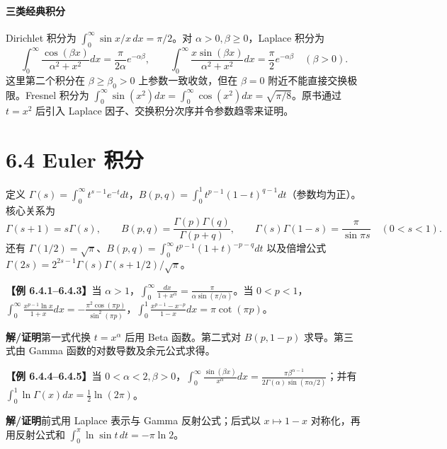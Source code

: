 \documentclass[UTF8,a4paper,11pt]{ctexart}
\newcommand{\ex}[1]{\par\noindent\textbf{【例 #1】}\;}
\newcommand{\sol}{\par\noindent\textbf{解/证明}\;}
\begin{document}
\paragraph{三类经典积分}Dirichlet 积分为 $\int_0^\infty\sin x/x\,dx=\pi/2$。对 $\alpha>0,\beta\ge0$，Laplace 积分为
\[\int_0^\infty\frac{\cos(\beta x)}{\alpha^2+x^2}dx=\frac\pi{2\alpha}e^{-\alpha\beta},\qquad
\int_0^\infty\frac{x\sin(\beta x)}{\alpha^2+x^2}dx=\frac\pi2e^{-\alpha\beta}\quad(\beta>0).\]
这里第二个积分在 $\beta\ge\beta_0>0$ 上参数一致收敛，但在 $\beta=0$ 附近不能直接交换极限。Fresnel 积分为 $\int_0^\infty\sin(x^2)dx=\int_0^\infty\cos(x^2)dx=\sqrt{\pi/8}$。原书通过 $t=x^2$ 后引入 Laplace 因子、交换积分次序并令参数趋零来证明。
\section*{6.4 Euler 积分}
定义 $\Gamma(s)=\int_0^\infty t^{s-1}e^{-t}dt$，$B(p,q)=\int_0^1t^{p-1}(1-t)^{q-1}dt$（参数均为正）。核心关系为
\[\Gamma(s+1)=s\Gamma(s),\qquad B(p,q)=\frac{\Gamma(p)\Gamma(q)}{\Gamma(p+q)},\qquad \Gamma(s)\Gamma(1-s)=\frac\pi{\sin\pi s}\quad(0<s<1).\]
还有 $\Gamma(1/2)=\sqrt\pi$、$B(p,q)=\int_0^\infty t^{p-1}(1+t)^{-p-q}dt$ 以及倍增公式 $\Gamma(2s)=2^{2s-1}\Gamma(s)\Gamma(s+1/2)/\sqrt\pi$。
\ex{6.4.1--6.4.3}当 $\alpha>1$，$\displaystyle\int_0^\infty\frac{dx}{1+x^\alpha}=\frac\pi{\alpha\sin(\pi/\alpha)}$。当 $0<p<1$，$\displaystyle\int_0^\infty\frac{x^{p-1}\ln x}{1+x}dx=-\frac{\pi^2\cos(\pi p)}{\sin^2(\pi p)}$，$\displaystyle\int_0^1\frac{x^{p-1}-x^{-p}}{1-x}dx=\pi\cot(\pi p)$。
\sol 第一式代换 $t=x^\alpha$ 后用 Beta 函数。第二式对 $B(p,1-p)$ 求导。第三式由 Gamma 函数的对数导数及余元公式求得。
\ex{6.4.4--6.4.5}当 $0<\alpha<2,\beta>0$，$\displaystyle\int_0^\infty\frac{\sin(\beta x)}{x^\alpha}dx=\frac{\pi\beta^{\alpha-1}}{2\Gamma(\alpha)\sin(\pi\alpha/2)}$；并有 $\displaystyle\int_0^1\ln\Gamma(x)dx=\frac12\ln(2\pi)$。
\sol 前式用 Laplace 表示与 Gamma 反射公式；后式以 $x\mapsto1-x$ 对称化，再用反射公式和 $\int_0^\pi\ln\sin t\,dt=-\pi\ln2$。
\end{document}
